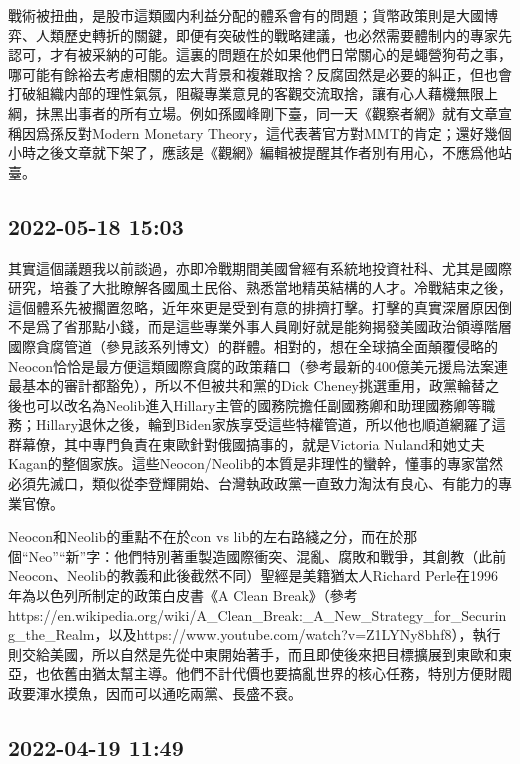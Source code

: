 \documentclass[twocolumn]{ctexart}
\begin{document}
戰術被扭曲，是股市這類國内利益分配的體系會有的問題；貨幣政策則是大國博弈、人類歷史轉折的關鍵，即便有突破性的戰略建議，也必然需要體制内的專家先認可，才有被采納的可能。這裏的問題在於如果他們日常關心的是蠅營狗苟之事，哪可能有餘裕去考慮相關的宏大背景和複雜取捨？反腐固然是必要的糾正，但也會打破組織内部的理性氣氛，阻礙專業意見的客觀交流取捨，讓有心人藉機無限上綱，抹黑出事者的所有立場。例如孫國峰剛下臺，同一天《觀察者網》就有文章宣稱因爲孫反對Modern Monetary Theory，這代表著官方對MMT的肯定；還好幾個小時之後文章就下架了，應該是《觀網》編輯被提醒其作者別有用心，不應爲他站臺。
\subsection*{2022-05-18 15:03}

其實這個議題我以前談過，亦即冷戰期間美國曾經有系統地投資社科、尤其是國際研究，培養了大批瞭解各國風土民俗、熟悉當地精英結構的人才。冷戰結束之後，這個體系先被擱置忽略，近年來更是受到有意的排擠打擊。打擊的真實深層原因倒不是爲了省那點小錢，而是這些專業外事人員剛好就是能夠揭發美國政治領導階層國際貪腐管道（參見該系列博文）的群體。相對的，想在全球搞全面顛覆侵略的Neocon恰恰是最方便這類國際貪腐的政策藉口（參考最新的400億美元援烏法案連最基本的審計都豁免），所以不但被共和黨的Dick Cheney挑選重用，政黨輪替之後也可以改名為Neolib進入Hillary主管的國務院擔任副國務卿和助理國務卿等職務；Hillary退休之後，輪到Biden家族享受這些特權管道，所以他也順道網羅了這群幕僚，其中專門負責在東歐針對俄國搞事的，就是Victoria Nuland和她丈夫Kagan的整個家族。這些Neocon/Neolib的本質是非理性的蠻幹，懂事的專家當然必須先滅口，類似從李登輝開始、台灣執政政黨一直致力淘汰有良心、有能力的專業官僚。

Neocon和Neolib的重點不在於con vs lib的左右路綫之分，而在於那個“Neo”“新”字：他們特別著重製造國際衝突、混亂、腐敗和戰爭，其創教（此前Neocon、Neolib的教義和此後截然不同）聖經是美籍猶太人Richard Perle在1996年為以色列所制定的政策白皮書《A Clean Break》（參考https://en.wikipedia.org/wiki/A\_Clean\_Break:\_A\_New\_Strategy\_for\_Securing\_the\_Realm，以及https://www.youtube.com/watch?v=Z1LYNy8bhf8），執行則交給美國，所以自然是先從中東開始著手，而且即使後來把目標擴展到東歐和東亞，也依舊由猶太幫主導。他們不計代價也要搞亂世界的核心任務，特別方便財閥政要渾水摸魚，因而可以通吃兩黨、長盛不衰。
\subsection*{2022-04-19 11:49}
\end{document}
